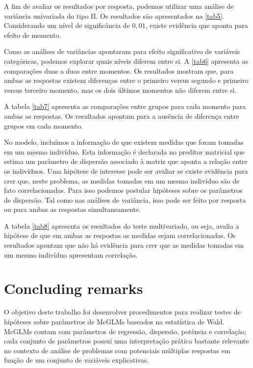 \documentclass[AMA,STIX1COL]{WileyNJD-v2}
\begin{document}
A fim de avaliar os resultados por resposta, podemos utilizar uma análise de variância univariada do tipo II. Os resultados são apresentados na \autoref{tab5}. Considerando um nível de significância de $0,01$, existe evidência que aponta para efeito de momento.

Como as análises de variâncias apontaram para efeito significativo de variáveis categóricas, podemos explorar quais níveis diferem entre si. A \autoref{tab6} apresenta as comparações duas a duas entre momentos. Os resultados mostram que, para ambas as respostas existem diferenças entre o primeiro versus segundo e primeiro versus terceiro momento, mas os dois últimos momentos não diferem entre si.

A tabela \autoref{tab7} apresenta as comparações entre grupos para cada momento para ambas as respostas. Os resultados apontam para a ausência de diferença entre grupos em cada momento.

No modelo, incluímos a informação de que existem medidas que foram tomadas em um mesmo indivíduo. Esta informação é declarada no preditor matricial que estima um parâmetro de dispersão associado à matriz que aponta a relação entre os indivíduos. Uma hipótese de interesse pode ser avaliar se existe evidência para crer que, neste problema, as medidas tomadas em um mesmo indivíduo são de fato correlacionadas. Para isso podemos postular hipóteses sobre os parâmetros de dispersão. Tal como nas análises de variância, isso pode ser feito por resposta ou para ambas as respostas simultaneamente.

A tabela \autoref{tab8} apresenta os resultados do teste multivariado, ou seja, avalia a hipótese de que em ambas as respostas as medidas sejam correlacionadas. Os resultados apontam que não há evidência para crer que as medidas tomadas em um mesmo indivíduo apresentam correlação.


\section{Concluding remarks}\label{sec7}

O objetivo deste trabalho foi desenvolver procedimentos para realizar testes de hipóteses sobre parâmetros de McGLMs baseados na estatística de Wald. McGLMs contam com parâmetros de regressão, dispersão, potência e correlação; cada conjunto de parâmetros possui uma interpretação prática bastante relevante no contexto de análise de problemas com potenciais múltiplas respostas em função de um conjunto de variáveis explicativas.
\end{document}
